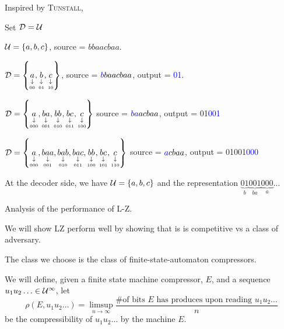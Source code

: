 Inspired by \textsc{Tunstall}, 

\begin{algorithm}
    \DontPrintSemicolon
    Set $\mathcal{D}=\mathcal{U}$\;
\end{algorithm}

\begin{example}
    $\mathcal{U} = \left\{ a,b,c \right\}$, source = $bbaacbaa$.

    $\mathcal{D} = \left\{ \underset{\underset{00}{\downarrow}}{a},\underset{\underset{01}{\downarrow}}{b},\underset{\underset{10}{\downarrow}}{c} \right\}$, source = $\textcolor{blue}{b}baacbaa$, output = \textcolor{blue}{01}.

    $\mathcal{D} = \left\{ \underset{\underset{000}{\downarrow}}{a},\underset{\underset{001}{\downarrow}}{ba},\underset{\underset{010}{\downarrow}}{bb},\underset{\underset{011}{\downarrow}}{bc},\underset{\underset{100}{\downarrow}}{c} \right\}$ source = $\textcolor{blue}{ba}acbaa$, output = 01\textcolor{blue}{001}

    $\mathcal{D} = \left\{ \underset{\underset{000}{\downarrow}}{a},\underset{\underset{001}{\downarrow}}{baa},\underset{\underset{010}{\downarrow}}{bab},\underset{\underset{011}{\downarrow}}{bac},\underset{\underset{100}{\downarrow}}{bb},\underset{\underset{101}{\downarrow}}{bc},\underset{\underset{110}{\downarrow}}{c} \right\}$ source = $\textcolor{blue}{a}cbaa$, output = 01001\textcolor{blue}{000}

    \bigskip    

    At the decoder side, we have $\mathcal{U} = \left\{ a,b,c \right\}$ and the representation $\underbrace{01}_b\underbrace{001}_{ba}\underbrace{000}_{a}\ldots$
\end{example}

Analysis of the performance of L-Z.

We will show LZ perform well by showing that is is competitive vs a class of adversary.

The class we choose is the class of finite-state-automaton compressors.

We will define, given a finite state machine compressor, $E$, and a sequence $u_1u_2\ldots \in \mathcal{U}^\infty$, let
\[
    \rho(E,u_1u_2\ldots) = \limsup\limits_{n\to\infty} \frac{\text{\# of bits }E\text{ has produces upon reading }u_1u_2\ldots}{n}
\]
be the compressibility of $u_1u_2\ldots$ by the machine $E$.

